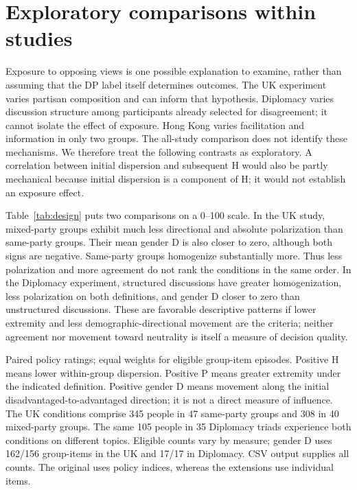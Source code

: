\documentclass[11pt]{article}
\begin{document}
\section{Exploratory comparisons within studies}
Exposure to opposing views is one possible explanation to examine, rather than
assuming that the DP label itself determines outcomes. The UK experiment varies
partisan composition and can inform that hypothesis. Diplomacy varies discussion
structure among participants already selected for disagreement; it cannot isolate
the effect of exposure. Hong Kong varies facilitation and information in only two
groups. The all-study comparison does not identify these mechanisms. We therefore
treat the following contrasts as exploratory. A correlation between initial
dispersion and subsequent H would also be partly mechanical because initial
dispersion is a component of H; it would not establish an exposure effect.

Table~\ref{tab:design} puts two comparisons on a 0--100 scale. In the UK study,
mixed-party groups exhibit much less directional and absolute polarization than
same-party groups. Their mean gender D is also closer to zero, although both signs
are negative. Same-party groups homogenize substantially more. Thus less
polarization and more agreement do not rank the conditions in the same order.
In the Diplomacy experiment, structured discussions have greater homogenization,
less polarization on both definitions, and gender D closer to zero than
unstructured discussions. These are favorable descriptive patterns if lower
extremity and less demographic-directional movement are the criteria; neither
agreement nor movement toward neutrality is itself a measure of decision quality.

\begin{table}[htbp]
\centering\small
\caption{Discussion conditions compared on a 0--100 attitude scale}
\label{tab:design}

\begin{minipage}{\linewidth}\footnotesize
Paired policy ratings; equal weights for eligible group-item episodes. Positive H
means lower within-group dispersion. Positive P means greater extremity under the
indicated definition. Positive gender D means movement along the initial
disadvantaged-to-advantaged direction; it is not a direct measure of influence.
The UK conditions comprise 345 people in 47 same-party groups and 308 in 40
mixed-party groups. The same 105 people in 35 Diplomacy triads experience both
conditions on different topics. Eligible counts vary by measure; gender D uses
162/156 group-items in the UK and 17/17 in Diplomacy. CSV output supplies all counts.
The original uses policy indices, whereas the extensions use individual items.
\end{minipage}
\end{table}
\end{document}

